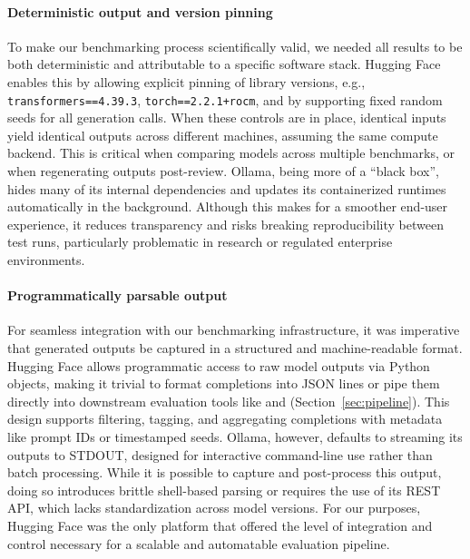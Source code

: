 \paragraph{Deterministic output and version pinning}
To make our benchmarking process scientifically valid, we needed all results to be both deterministic and attributable to a specific software stack. Hugging Face enables this by allowing explicit pinning of library versions, e.g., \texttt{transformers==4.39.3}, \texttt{torch==2.2.1+rocm}, and by supporting fixed random seeds for all generation calls. When these controls are in place, identical inputs yield identical outputs across different machines, assuming the same compute backend. This is critical when comparing models across multiple benchmarks, or when regenerating outputs post-review. Ollama, being more of a ``black box'', hides many of its internal dependencies and updates its containerized runtimes automatically in the background. Although this makes for a smoother end-user experience, it reduces transparency and risks breaking reproducibility between test runs, particularly problematic in research or regulated enterprise environments.

\paragraph{Programmatically parsable output}
For seamless integration with our benchmarking infrastructure, it was imperative that generated outputs be captured in a structured and machine-readable format. Hugging Face allows programmatic access to raw model outputs via Python objects, making it trivial to format completions into JSON lines or pipe them directly into downstream evaluation tools like  and  (Section~\ref{sec:pipeline}). This design supports filtering, tagging, and aggregating completions with metadata like prompt IDs or timestamped seeds. Ollama, however, defaults to streaming its outputs to STDOUT, designed for interactive command-line use rather than batch processing. While it is possible to capture and post-process this output, doing so introduces brittle shell-based parsing or requires the use of its REST API, which lacks standardization across model versions. For our purposes, Hugging Face was the only platform that offered the level of integration and control necessary for a scalable and automatable evaluation pipeline.

